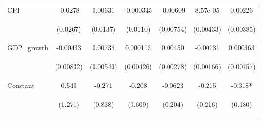 \documentclass[]{article}
\begin{document}
\begin{center}
\begin{tabular}{lcccccc}
CPI & -0.0278 & 0.00631 & -0.000345 & -0.00609 & 8.57e-05 & 0.00226 \\
\vspace{4pt} & \begin{footnotesize}(0.0267)\end{footnotesize} & \begin{footnotesize}(0.0137)\end{footnotesize} & \begin{footnotesize}(0.0110)\end{footnotesize} & \begin{footnotesize}(0.00754)\end{footnotesize} & \begin{footnotesize}(0.00433)\end{footnotesize} & \begin{footnotesize}(0.00385)\end{footnotesize} \\
GDP\_growth & -0.00433 & 0.00734 & 0.000113 & 0.00450 & -0.00131 & 0.000363 \\
\vspace{4pt} & \begin{footnotesize}(0.00832)\end{footnotesize} & \begin{footnotesize}(0.00540)\end{footnotesize} & \begin{footnotesize}(0.00426)\end{footnotesize} & \begin{footnotesize}(0.00278)\end{footnotesize} & \begin{footnotesize}(0.00166)\end{footnotesize} & \begin{footnotesize}(0.00157)\end{footnotesize} \\
Constant & 0.540 & -0.271 & -0.208 & -0.0623 & -0.215 & -0.318* \\
 & \begin{footnotesize}(1.271)\end{footnotesize} & \begin{footnotesize}(0.838)\end{footnotesize} & \begin{footnotesize}(0.609)\end{footnotesize} & \begin{footnotesize}(0.204)\end{footnotesize} & \begin{footnotesize}(0.216)\end{footnotesize} & \begin{footnotesize}(0.180)\end{footnotesize} \\

\end{tabular}
\end{center}
\end{document}
